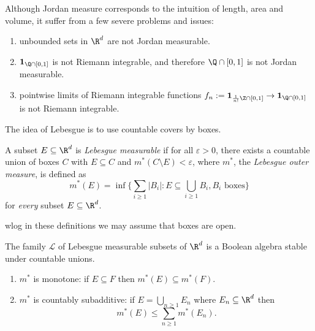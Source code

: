 \documentclass[a4paper]{article}
\begin{document}
Although Jordan measure corresponds to the intuition of length, area and volume, it suffer from a few severe problems and issues:
\begin{enumerate}
\item unbounded sets in \(\R^d\) are not Jordan measurable.
\item \(\mathbf 1_{\Q \cap [0, 1]}\) is not Riemann integrable, and therefore \(\Q \cap [0, 1]\) is not Jordan measurable.
\item pointwise limits of Riemann integrable functions \(f_n := \mathbf 1_{\frac{1}{n!} \Z \cap [0, 1]} \to \mathbf 1_{\Q \cap [0, 1]}\) is not Riemann integrable.
\end{enumerate}

The idea of Lebesgue is to use countable covers by boxes.

\begin{definition}
  A subset \(E \subseteq \R^d\) is \emph{Lebesgue measurable} if for all \(\varepsilon > 0\), there exists a countable union of boxes \(C\) with \(E \subseteq C\) and \(m^*(C \setminus E) < \varepsilon\), where \(m^*\), the \emph{Lebesgue outer measure}, is defined as
  \[
    m^*(E) = \inf \{\sum_{i \geq 1} |B_i|: E \subseteq \bigcup_{i \geq 1} B_i, B_i \text{ boxes}\}
  \]
  for \emph{every} subset \(E \subseteq \R^d\).
\end{definition}

\begin{remark}
  wlog in these definitions we may assume that boxes are open.
\end{remark}


\begin{proposition}
  \label{prop:Lebesgue measurable subset is Boolean algebra}
  The family \(\mathcal L\) of Lebesgue measurable subsets of \(\R^d\) is a Boolean algebra stable under countable unions.
\end{proposition}

\begin{lemma}\leavevmode
  \begin{enumerate}
  \item \(m^*\) is monotone: if \(E \subseteq F\) then \(m^*(E) \subseteq m^*(F)\).
  \item \(m^*\) is countably subadditive: if \(E = \bigcup_{n \geq 1} E_n\) where \(E_n \subseteq \R^d\) then
    \[
      m^*(E) \leq \sum_{n \geq 1} m^*(E_n).
    \]
  \end{enumerate}
\end{lemma}
\end{document}
